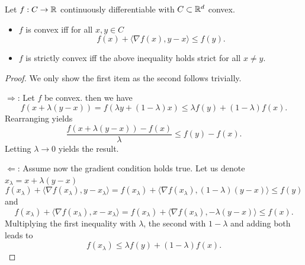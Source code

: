\begin{theorem}\label{convexity:thm:first_order}
    Let $f:C\rightarrow\mathbb{R}$ continuously differentiable with $C\subset\mathbb{R}^d$ convex.
    \begin{itemize}
        \item $f$ is convex iff for all $x,y\in C$
        \[
            f(x) + \langle \nabla f(x),y-x\rangle \leq f(y).
        \]
        \item $f$ is strictly convex iff the above inequality holds strict for all $x\neq y$.
    \end{itemize}
\end{theorem}
\begin{proof}
    We only show the first item as the second follows trivially.
    
    $\Rightarrow$: Let $f$ be convex. then we have
    \begin{equation}
        f(x+\lambda (y-x)) = f(\lambda y + (1-\lambda)x)\leq \lambda f(y) + (1-\lambda) f(x).
    \end{equation}
    Rearranging yields
    \begin{equation}
        \frac{f(x+\lambda (y-x))-f(x)}{\lambda} \leq f(y) - f(x).
    \end{equation}
    Letting $\lambda\rightarrow 0$ yields the result.

    $\Leftarrow$: Assume now the gradient condition holds true. Let us denote $x_\lambda = x+\lambda (y-x)$
    \begin{equation*}
        f(x_\lambda) + \langle \nabla f(x_\lambda), y-x_\lambda\rangle = f(x_\lambda) + \langle \nabla f(x_\lambda), (1-\lambda) (y-x)\rangle \leq f(y)
    \end{equation*}
    and
    \begin{equation*}
        f(x_\lambda) + \langle \nabla f(x_\lambda), x-x_\lambda\rangle = f(x_\lambda) + \langle \nabla f(x_\lambda), -\lambda(y-x)\rangle \leq f(x).
    \end{equation*}
    Multiplying the first inequality with $\lambda$, the second with $1-\lambda$ and adding both leads to
    \begin{equation*}
        f(x_\lambda) \leq \lambda f(y) +(1-\lambda) f(x).
    \end{equation*}
\end{proof}


